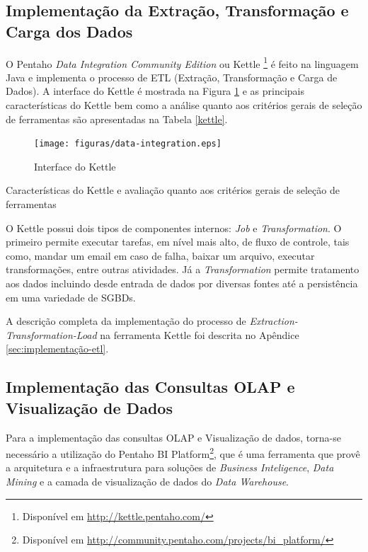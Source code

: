 \subsection{Implementação da Extração, Transformação e Carga dos Dados}
\label{implementação-ETL}
O Pentaho \textit{Data Integration Community Edition} ou Kettle \footnote{Disponível em \url{http://kettle.pentaho.com/}} é feito na linguagem Java e implementa o processo de ETL (Extração, Transformação e Carga de Dados). A interface do Kettle é mostrada na Figura \ref{pdi} e as principais características do Kettle bem como a análise quanto aos critérios gerais de seleção de ferramentas são apresentadas na Tabela \ref{kettle}.

\begin{figure}[ht!]
\centering
\texttt{[image: figuras/data-integration.eps]}
\caption{Interface do Kettle}
\label{pdi}
\end{figure}
\FloatBarrier
 

\begin{table}[!ht]

\caption{Características do Kettle e avaliação quanto aos critérios gerais de seleção de ferramentas}
\label{kettle}
\end{table}
\FloatBarrier	

O Kettle possui dois tipos de componentes internos: \textit{Job} e \textit{Transformation}. O primeiro permite executar tarefas, em nível mais alto, de fluxo de controle, tais como, mandar um email em caso de falha, baixar um arquivo, executar transformações, entre outras atividades. Já a \textit{Transformation} permite tratamento aos dados incluindo desde entrada de dados por diversas fontes até a persistência em uma variedade de SGBDs.


A descrição completa da implementação do processo de \textit{Extraction-Transformation-Load} na ferramenta Kettle foi descrita no Apêndice \ref{sec:implementação-etl}.

\subsection{Implementação das Consultas OLAP e Visualização de Dados}

Para a implementação das consultas OLAP e Visualização de dados, torna-se necessário a utilização do Pentaho BI Platform\footnote{Disponível em \url{http://community.pentaho.com/projects/bi_platform/}}, que é uma ferramenta que provê a arquitetura e a infraestrutura para soluções de \textit{Business Inteligence}, \textit{Data Mining} e a camada de visualização de dados do \textit{Data Warehouse}.


